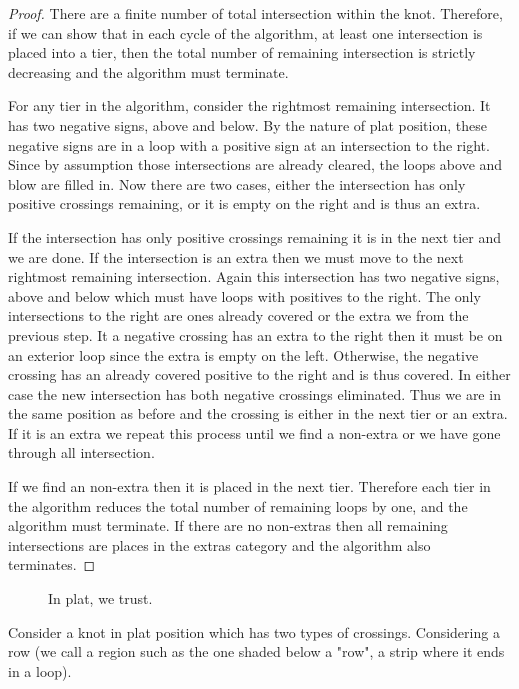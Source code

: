 \documentclass[11pt,oneside]{amsart}
\begin{document}
\begin{proof}
    There are a finite number of total intersection within the knot. Therefore, if we can show that in each cycle of the algorithm, at least one intersection is placed into a tier, then the total number of remaining intersection is strictly decreasing and the algorithm must terminate.

    For any tier in the algorithm, consider the rightmost remaining intersection. It has two negative signs, above and below. By the nature of plat position, these negative signs are in a loop with a positive sign at an intersection to the right. Since by assumption those intersections are already cleared, the loops above and blow are filled in. Now there are two cases, either the intersection has only positive crossings remaining, or it is empty on the right and is thus an extra.

    If the intersection has only positive crossings remaining it is in the next tier and we are done. If the intersection is an extra then we must move to the next rightmost remaining intersection. Again this intersection has two negative signs, above and below which must have loops with positives to the right. The only intersections to the right are ones already covered or the extra we from the previous step. It a negative crossing has an extra to the right then it must be on an exterior loop since the extra is empty on the left. Otherwise, the negative crossing has an already covered positive to the right and is thus covered. In either case the new intersection has both negative crossings eliminated. Thus we are in the same position as before and the crossing is either in the next tier or an extra. If it is an extra we repeat this process until we find a non-extra or we have gone through all intersection.

    If we find an non-extra then it is placed in the next tier. Therefore each tier in the algorithm reduces the total number of remaining loops by one, and the algorithm must terminate. If there are no non-extras then all remaining intersections are places in the extras category and the algorithm also terminates. 
\end{proof}

\begin{figure}[htbp]
  \label{fig:PlatProof}
  \centering
  
  \caption{In plat, we trust.}
\end{figure}


Consider a knot in plat position which has two types of crossings. Considering a row (we call a region such as the one shaded below a "row", a strip where it ends in a loop).
\end{document}
